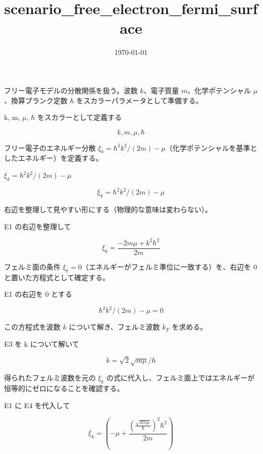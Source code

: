 \documentclass[dvipdfmx,a4paper,11pt]{jsarticle}
\title{scenario\_free\_electron\_fermi\_surface}
\date{\today}
\begin{document}
\maketitle

フリー電子モデルの分散関係を扱う。波数 $k$、電子質量 $m$、化学ポテンシャル $\mu$、換算プランク定数 $\hbar$ をスカラーパラメータとして準備する。

k, m, $\mu$, $\hbar$ をスカラーとして定義する

\[
  k, m, \mu, \hbar
\]

フリー電子のエネルギー分散 $\xi_k=\hbar^2k^2/(2m)-\mu$（化学ポテンシャルを基準としたエネルギー）を定義する。

$\xi_k = \hbar^2 k^2 / (2 m) - \mu$

\begin{equation}
  \xi_k = \hbar^2 k^2 / (2 m) - \mu
  \label{eq:E1}
\end{equation}

右辺を整理して見やすい形にする（物理的な意味は変わらない）。

E1 の右辺を整理して

\begin{equation}
  \xi_k = \frac{ - 2 m \mu + k^{2} \hbar^{2}}{2 m}
  \label{eq:E2}
\end{equation}

フェルミ面の条件 $\xi_k=0$（エネルギーがフェルミ準位に一致する）を、右辺を 0 と置いた方程式として確定する。

E1 の右辺を 0 とする

\begin{equation}
  \hbar^2 k^2 / (2 m) - \mu = 0
  \label{eq:E3}
\end{equation}

この方程式を波数 $k$ について解き、フェルミ波数 $k_F$ を求める。

E3 を k について解いて

\begin{equation}
  k = \sqrt{2} \sqrt{m \mu}/\hbar
  \label{eq:E4}
\end{equation}

得られたフェルミ波数を元の $\xi_k$ の式に代入し、フェルミ面上ではエネルギーが恒等的にゼロになることを確認する。

E1 に E4 を代入して

\begin{equation}
  \xi_k = \left( - \mu + \frac{\left( \frac{\sqrt{2 m \mu}}{\hbar} \right)^{2} \hbar^{2}}{2 m}\right)
  \label{eq:E5}
\end{equation}
\end{document}
